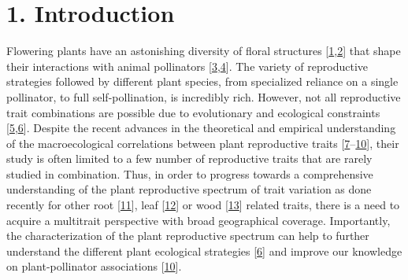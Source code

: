 \documentclass[
  12pt,
  a4paper,
]{article}
\begin{document}
\doublespacing
\vspace{5mm}
\normalsize

\hypertarget{introduction}{%
\section{1. Introduction}\label{introduction}}

Flowering plants have an astonishing diversity of floral structures {[}\protect\hyperlink{ref-barrett2002}{1},\protect\hyperlink{ref-schiestl2013}{2}{]} that shape their interactions with animal pollinators {[}\protect\hyperlink{ref-fenster2004}{3},\protect\hyperlink{ref-dellinger2020}{4}{]}. The variety of reproductive strategies followed by different plant species, from specialized reliance on a single pollinator, to full self-pollination, is incredibly rich. However, not all reproductive trait combinations are possible due to evolutionary and ecological constraints {[}\protect\hyperlink{ref-stearns1989}{5},\protect\hyperlink{ref-agrawal2020}{6}{]}. Despite the recent advances in the theoretical and empirical understanding of the macroecological correlations between plant reproductive traits {[}\protect\hyperlink{ref-salguero2016}{7}--\protect\hyperlink{ref-roddy2021}{10}{]}, their study is often limited to a few number of reproductive traits that are rarely studied in combination. Thus, in order to progress towards a comprehensive understanding of the plant reproductive spectrum of trait variation as done recently for other root {[}\protect\hyperlink{ref-laughlin2021}{11}{]}, leaf {[}\protect\hyperlink{ref-wright2004}{12}{]} or wood {[}\protect\hyperlink{ref-chave2009}{13}{]} related traits, there is a need to acquire a multitrait perspective with broad geographical coverage. Importantly, the characterization of the plant reproductive spectrum can help to further understand the different plant ecological strategies {[}\protect\hyperlink{ref-agrawal2020}{6}{]} and improve our knowledge on plant-pollinator associations {[}\protect\hyperlink{ref-roddy2021}{10}{]}.
\end{document}
